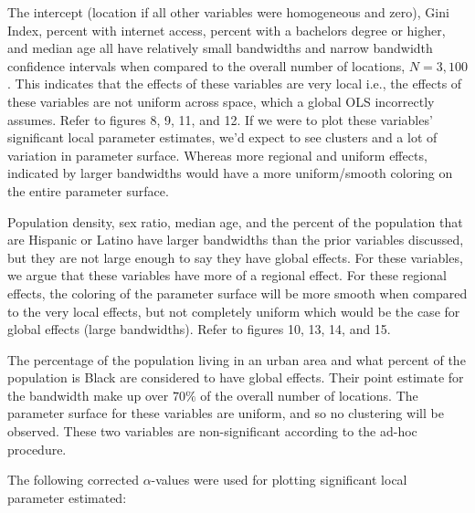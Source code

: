 \documentclass[
]{article}
\begin{document}
The intercept (location if all other variables were homogeneous and
zero), Gini Index, percent with internet access, percent with a
bachelors degree or higher, and median age all have relatively small
bandwidths and narrow bandwidth confidence intervals when compared to
the overall number of locations, \(N = 3,100\). This indicates that the
effects of these variables are very local i.e., the effects of these
variables are not uniform across space, which a global OLS incorrectly
assumes. Refer to figures 8, 9, 11, and 12. If we were to plot these
variables' significant local parameter estimates, we'd expect to see
clusters and a lot of variation in parameter surface. Whereas more
regional and uniform effects, indicated by larger bandwidths would have
a more uniform/smooth coloring on the entire parameter surface.

Population density, sex ratio, median age, and the percent of the
population that are Hispanic or Latino have larger bandwidths than the
prior variables discussed, but they are not large enough to say they
have global effects. For these variables, we argue that these variables
have more of a regional effect. For these regional effects, the coloring
of the parameter surface will be more smooth when compared to the very
local effects, but not completely uniform which would be the case for
global effects (large bandwidths). Refer to figures 10, 13, 14, and 15.

The percentage of the population living in an urban area and what
percent of the population is Black are considered to have global
effects. Their point estimate for the bandwidth make up over \(70\%\) of
the overall number of locations. The parameter surface for these
variables are uniform, and so no clustering will be observed. These two
variables are non-significant according to the ad-hoc procedure.

The following corrected \(\alpha\)-values were used for plotting
significant local parameter estimated:
\end{document}
